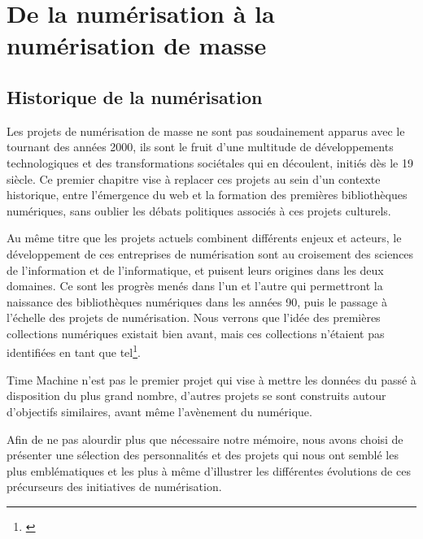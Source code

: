 \part{De la numérisation à la numérisation de masse}

\chapter{Historique de la numérisation}
Les projets de numérisation de masse ne sont pas soudainement apparus avec le tournant des années 2000, ils sont le fruit d'une multitude de développements technologiques et des transformations sociétales qui en découlent, initiés dès le 19 siècle. Ce premier chapitre vise à replacer ces projets au sein d'un contexte historique, entre l'émergence du web et la formation des premières bibliothèques numériques, sans oublier les débats politiques associés à ces projets culturels. 

Au même titre que les projets actuels combinent différents enjeux et acteurs, le développement de ces entreprises de numérisation sont au croisement des sciences de l'information et de l'informatique, et puisent leurs origines dans les deux domaines. Ce sont les progrès menés dans l'un et l'autre qui permettront la naissance des bibliothèques numériques dans les années 90, puis le passage à l'échelle des projets de numérisation. Nous verrons que l'idée des premières collections numériques existait bien avant, mais ces collections n'étaient pas identifiées en tant que tel\footnote{\cite[p. 8]{xie_discover_2016}}. 

Time Machine n'est pas le premier projet qui vise à mettre les données du passé à disposition du plus grand nombre, d'autres projets se sont construits autour d'objectifs similaires, avant même l'avènement du numérique.

 Afin de ne pas alourdir plus que nécessaire notre mémoire, nous avons choisi de présenter une sélection des personnalités et des projets qui nous ont semblé les plus emblématiques et les plus à même d'illustrer les différentes évolutions de ces précurseurs des initiatives de numérisation. 

